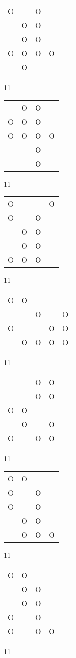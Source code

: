 \begin{tabular}{|m{0.2cm}m{0.2cm}m{0.2cm}m{0.2cm}|}\hline
O& &O& \\
 &O&O& \\
 &O&O& \\
O&O&O&O\\
 &O& & \\
\hline\end{tabular}11
\begin{tabular}{|m{0.2cm}m{0.2cm}m{0.2cm}m{0.2cm}|}\hline
 &O&O& \\
O&O&O& \\
O&O&O&O\\
 & &O& \\
 & &O& \\
\hline\end{tabular}11
\begin{tabular}{|m{0.2cm}m{0.2cm}m{0.2cm}m{0.2cm}|}\hline
O& & &O\\
O& &O& \\
 &O&O& \\
 &O&O& \\
O&O&O& \\
\hline\end{tabular}11
\begin{tabular}{|m{0.2cm}m{0.2cm}m{0.2cm}m{0.2cm}m{0.2cm}|}\hline
O&O& & & \\
 & &O& &O\\
O& & &O&O\\
 &O&O&O&O\\
\hline\end{tabular}11
\begin{tabular}{|m{0.2cm}m{0.2cm}m{0.2cm}m{0.2cm}|}\hline
 & &O&O\\
 & &O&O\\
O&O& & \\
 &O& &O\\
O& &O&O\\
\hline\end{tabular}11
\begin{tabular}{|m{0.2cm}m{0.2cm}m{0.2cm}m{0.2cm}|}\hline
O&O& & \\
O& &O& \\
O& &O& \\
 &O&O& \\
 &O&O&O\\
\hline\end{tabular}11
\begin{tabular}{|m{0.2cm}m{0.2cm}m{0.2cm}m{0.2cm}|}\hline
O&O& & \\
 &O&O& \\
 &O&O& \\
O& &O& \\
O& &O&O\\
\hline\end{tabular}11
